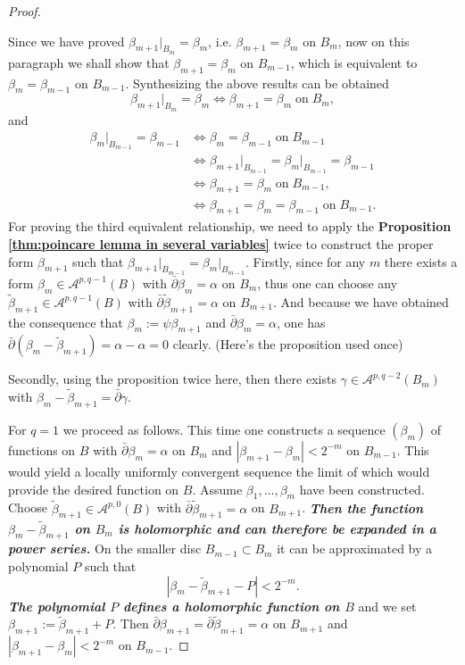 \begin{proof}
  \begin{fancybox}
Since we have proved $\beta_{m+1}\big|_{B_m}=\beta_m$, i.e. $\beta_{m+1}=\beta_{m}$ on $B_m$, now on this paragraph we shall show that $\beta_{m+1}=\beta_m$ on $B_{m-1}$, which is equivalent to $\beta_m=\beta_{m-1}$ on $B_{m-1}$. Synthesizing the above results can be obtained
\[
  \beta_{m+1}\big|_{B_m}=\beta_m \iff \beta_{m+1}=\beta_m \;\text{on}\; B_{m},
\]
and
  \begin{align*}
    \beta_m\big|_{B_{m-1}}=\beta_{m-1} &\iff \beta_m=\beta_{m-1} \;\text{on}\; B_{m-1} \\
    &\iff \beta_{m+1}\big|_{B_{m-1}}=\beta_m\big|_{B_{m-1}}=\beta_{m-1}\\
    &\iff \beta_{m+1} =\beta_m \;\text{on}\; B_{m-1},\\
    &\iff \beta_{m+1} =\beta_m=\beta_{m-1} \;\text{on}\; B_{m-1}.
  \end{align*}
  For proving the third equivalent relationship, we need to apply the \textbf{Proposition \ref{thm:poincare lemma in several variables}} twice to construct the proper form $\beta_{m+1}$ such that $\beta_{m+1}|_{B_{m-1}}=\beta_m\big|_{B_{m-1}}$. Firstly, since for any $m$ there exists a form $\beta_m \in \mathcal{A}^{p, q-1}(B)$ with $\bar{\partial} \beta_m=\alpha$ on $B_m$, thus one can choose any $\tilde{\beta}_{m+1} \in \mathcal{A}^{p, q-1}(B)$ with $\bar{\partial} \tilde{\beta}_{m+1}=\alpha$ on $B_{m+1}$. And because we have obtained the consequence that $\beta_m:=\psi\beta_{m+1}$ and $\bar{\partial}\beta_m=\alpha$, one has $\bar{\partial}\left(\beta_m-\tilde{\beta}_{m+1}\right)=\alpha-\alpha=0$ clearly. (Here's the proposition used once)
  
  Secondly, using the proposition twice here, then there exists $\gamma \in \mathcal{A}^{p, q-2}\left(B_m\right)$ with $\beta_m-\tilde{\beta}_{m+1}=\bar{\partial} \gamma$. 
\end{fancybox}

For $q=1$ we proceed as follows. This time one constructs a sequence $\left(\beta_m\right)$ of functions on $B$ with $\bar{\partial} \beta_m=\alpha$ on $B_m$ and $\left|\beta_{m+1}-\beta_m\right|<2^{-m}$ on $B_{m-1}$. This would yield a locally uniformly convergent sequence the limit of which would provide the desired function on $B$. Assume $\beta_1, \ldots, \beta_m$ have been constructed. Choose $\tilde{\beta}_{m+1} \in \mathcal{A}^{p, 0}(B)$ with $\bar{\partial} \tilde{\beta}_{m+1}=\alpha$ on $B_{m+1}$. \textit{\textbf{Then the function $\beta_m-\tilde{\beta}_{m+1}$ on $B_m$ is holomorphic and can therefore be expanded in a power series.}} On the smaller disc $B_{m-1} \subset B_m$ it can be approximated by a polynomial $P$ such that $$\left|\beta_m-\tilde{\beta}_{m+1}-P\right|<2^{-m}.$$ \textit{\textbf{The polynomial $P$ defines a holomorphic function on $B$}} and we set \textcolor[rgb]{0.68,0.15,0.40}{$\beta_{m+1}:=\tilde{\beta}_{m+1}+P$}. Then $\bar{\partial} \beta_{m+1}=\bar{\partial} \tilde{\beta}_{m+1}=\alpha$ on $B_{m+1}$ and $\left|\beta_{m+1}-\beta_m\right|<2^{-m}$ on $B_{m-1}$.
\end{proof}

